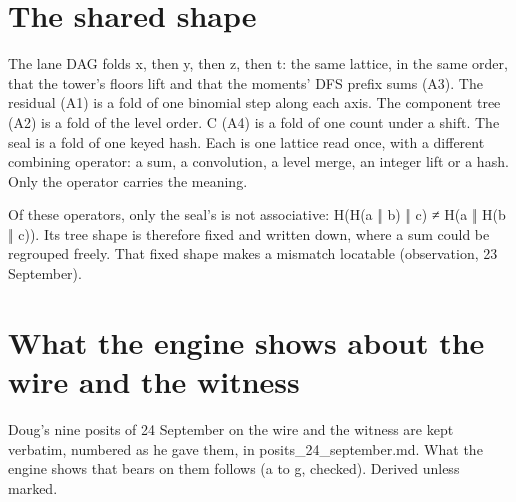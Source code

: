 \section{\texorpdfstring{The shared shape}{The shared shape}}

The lane DAG folds x, then y, then z, then t: the same lattice, in the same order, that the tower's floors lift and that the moments' DFS prefix sums (A3). The residual (A1) is a fold of one binomial step along each axis. The component tree (A2) is a fold of the level order. C (A4) is a fold of one count under a shift. The seal is a fold of one keyed hash. Each is one lattice read once, with a different combining operator: a sum, a convolution, a level merge, an integer lift or a hash. Only the operator carries the meaning.

Of these operators, only the seal's is not associative: H(H(a ‖ b) ‖ c) ≠ H(a ‖ H(b ‖ c)). Its tree shape is therefore fixed and written down, where a sum could be regrouped freely. That fixed shape makes a mismatch locatable (observation, 23 September).

\section{\texorpdfstring{What the engine shows about the wire and the witness}{What the engine shows about the wire and the witness}}

Doug's nine posits of 24 September on the wire and the witness are kept verbatim, numbered as he gave them, in posits\_\allowbreak{}24\_\allowbreak{}september.md. What the engine shows that bears on them follows (a to g, checked). Derived unless marked.

